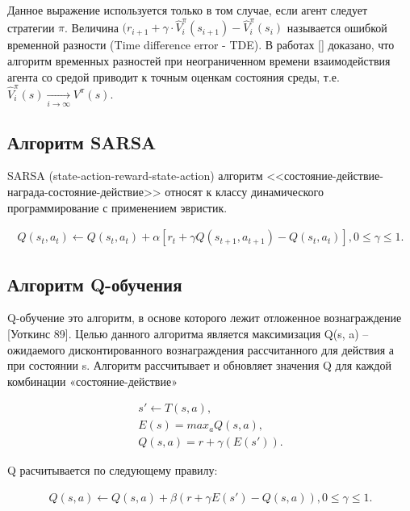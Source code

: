 Данное выражение используется только в том случае, если агент следует стратегии $ \pi $. Величина $ (r_{i+1}+ \gamma\cdot\hat{V}^{\pi}_{i}(s_{i+1})-\hat{V}^{\pi}_{i}(s_{i}) $ называется ошибкой временной разности (Time difference error - TDE). В работах [] доказано, что алгоритм временных разностей при неограниченном времени взаимодействия агента со средой приводит к точным оценкам состояния среды, т.е. $ \hat{V}^{\pi}_{i}(s) \underset{i\rightarrow\infty}\longrightarrow {V}^{\pi}(s) $.

\subsection{Алгоритм SARSA} \label{subsect1_6_2}
SARSA (state-action-reward-state-action) алгоритм <<состояние-действие-награда-состояние-действие>> относят к классу динамического программирование с применением эвристик. 

\begin{equation}
\label{eq:1_3_2p1}
\begin{alignedat}{2}
Q(s_{t},a_{t}) \leftarrow Q(s_{t},a_{t}) + \alpha[r_{t} + \gamma Q(s_{t+1},a_{t+1}) - Q(s_{t},a_{t})], 0 \le \gamma \le 1.
\end{alignedat}
\end{equation}

\subsection{Алгоритм Q-обучения} \label{subsect1_6_3}

Q-обучение это алгоритм, в основе которого лежит отложенное  вознаграждение [Уоткинс 89]. Целью данного алгоритма является максимизация Q(s, a) – ожидаемого дисконтированного вознаграждения рассчитанного для действия а при состоянии s. Алгоритм рассчитывает и обновляет значения Q для каждой комбинации «состояние-действие»

\begin{equation}
\label{eq:1_3_3p1}
\begin{alignedat}{2}
s' \leftarrow T(s,a),\\
E(s)=max_{a}Q(s,a),\\
Q(s,a)=r + \gamma(E(s')).
\end{alignedat}
\end{equation}

Q расчитывается по следующему правилу:

\begin{equation}
\label{eq:1_3_3p2}
\begin{alignedat}{2}
Q(s,a) \leftarrow Q(s,a) + \beta(r + \gamma E(s') - Q(s,a)), 0 \le \gamma \le 1.
\end{alignedat}
\end{equation}

